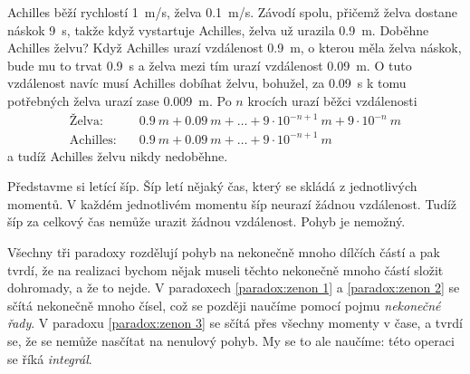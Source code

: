 \begin{paradox}\label{paradox:zenon 2}
	Achilles běží rychlostí \SI{1}{m/s}, želva \SI{0,1}{m/s}. Závodí spolu, přičemž želva dostane náskok \SI{9}{s}, takže když vystartuje Achilles, želva už urazila \SI{0,9}{m}. Doběhne Achilles želvu? Když Achilles urazí vzdálenost \SI{0,9}{m}, o kterou měla želva náskok, bude mu to trvat \SI{0,9}{s} a želva mezi tím urazí vzdálenost \SI{0,09}{m}. O tuto vzdálenost navíc musí Achilles dobíhat želvu, bohužel, za \SI{0,09}{s} k tomu potřebných želva urazí zase \SI{0,009}{m}. Po $n$ krocích urazí běžci vzdálenosti
\begin{align*}
	\text{Želva:} \quad &\SI{0,9}{m}+\SI{0,09}{m}+\hdots +9\cdot 10^{-n+1}\SI{}{m}+9\cdot 10^{-n}\SI{}{m}\\
	\text{Achilles:} \quad &\SI{0,9}{m}+\SI{0,09}{m}+\hdots +9\cdot 10^{-n+1}\SI{}{m}
\end{align*}
a tudíž Achilles želvu nikdy nedoběhne.
\end{paradox}

\begin{paradox}\label{paradox:zenon 3} Představme si letící šíp. Šíp letí nějaký čas, který se skládá z jednotlivých momentů. V každém jednotlivém momentu šíp neurazí žádnou vzdálenost. Tudíž šíp za celkový čas nemůže urazit žádnou vzdálenost. Pohyb je nemožný. 
\end{paradox}

Všechny tři paradoxy rozdělují pohyb na nekonečně mnoho dílčích částí a pak tvrdí, že na realizaci  bychom nějak museli těchto nekonečně mnoho částí složit dohromady, a že to nejde. V paradoxech \ref{paradox:zenon 1} a \ref{paradox:zenon 2} se sčítá nekonečně mnoho čísel, což se později naučíme pomocí pojmu \emph{nekonečné řady}. V paradoxu \ref{paradox:zenon 3} se sčítá  přes všechny momenty v čase, a tvrdí se, že se nemůže nasčítat na nenulový pohyb. My se to ale naučíme: této operaci se říká \emph{integrál}.

